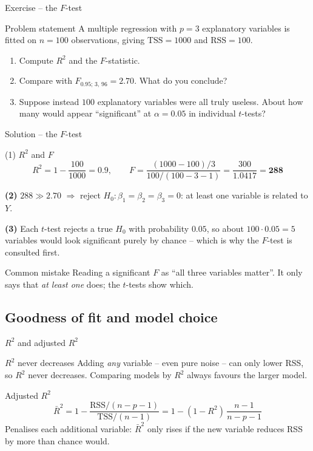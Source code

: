 \documentclass[aspectratio=169,11pt]{beamer}
\begin{document}
\begin{frame}{Exercise -- the $F$-test}
  \begin{block}{Problem statement}
    A multiple regression with $p=3$ explanatory variables is fitted on
    $n=100$ observations, giving $\text{TSS}=1000$ and $\text{RSS}=100$.
    \begin{enumerate}
      \item Compute $R^2$ and the $F$-statistic.
      \item Compare with $F_{0.95;\,3,\,96}=2.70$. What do you conclude?
      \item Suppose instead $100$ explanatory variables were all truly
            useless. About how many would appear ``significant'' at
            $\alpha=0.05$ in individual $t$-tests?
    \end{enumerate}
  \end{block}
\end{frame}

\begin{frame}{Solution -- the $F$-test}
  \begin{exampleblock}{(1) $R^2$ and $F$}
    \[
      R^2=1-\frac{100}{1000}=0.9,\qquad
      F=\frac{(1000-100)/3}{100/(100-3-1)}=\frac{300}{1.0417}=\mathbf{288}
    \]
  \end{exampleblock}
  \textbf{(2)} $288\gg2.70$ $\Rightarrow$ reject
  $H_0:\beta_1=\beta_2=\beta_3=0$: at least one variable is related to $Y$.

  \medskip
  \textbf{(3)} Each $t$-test rejects a true $H_0$ with probability
  $0.05$, so about $100\cdot0.05=5$ variables would look significant purely
  by chance -- which is why the $F$-test is consulted first.
  \begin{alertblock}{Common mistake}
    Reading a significant $F$ as ``all three variables matter''. It only
    says that \emph{at least one} does; the $t$-tests show which.
  \end{alertblock}
\end{frame}

\subsection{Goodness of fit and model choice}

\begin{frame}{$R^2$ and adjusted $R^2$}
  \begin{alertblock}{$R^2$ never decreases}
    Adding \emph{any} variable -- even pure noise -- can only lower RSS, so
    $R^2$ never decreases. Comparing models by $R^2$ always favours the
    larger model.
  \end{alertblock}
  \begin{block}{Adjusted $R^2$}
    \[
      \bar R^2=1-\frac{\text{RSS}/(n-p-1)}{\text{TSS}/(n-1)}
              =1-(1-R^2)\,\frac{n-1}{n-p-1}
    \]
    Penalises each additional variable: $\bar R^2$ only rises if the new
    variable reduces RSS by more than chance would.
  \end{block}
\end{frame}
\end{document}

